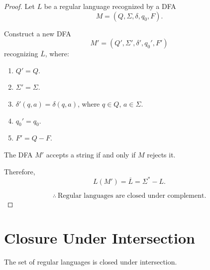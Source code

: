 \documentclass[11pt]{scrreprt}
\begin{document}
\begin{proof}
    Let $L$ be a regular language recognized by a DFA
    \[
        M = (Q, \Sigma, \delta, q_0, F).
    \]

    Construct a new DFA
    \[
        M' = (Q', \Sigma', \delta', q_0', F')
    \]
    recognizing $\overline{L}$, where:

    \begin{enumerate}
        \item $Q' = Q$.

        \item $\Sigma' = \Sigma$.

        \item $\delta'(q,a) = \delta(q,a)$,
        where $q \in Q$, $a \in \Sigma$.

        \item $q_0' = q_0$.

        \item $F' = Q - F$.
    \end{enumerate}

    The DFA $M'$ accepts a string if and only if
    $M$ rejects it.

    Therefore,
    \[
        L(M') = \overline{L} = \Sigma^* - L.
    \]

    \[
        \boxed{
            \therefore\ \text{Regular languages are closed under complement.}
        }
    \]
\end{proof}

\section{Closure Under Intersection}
\begin{theorem*}
    The set of regular languages is closed under intersection.
\end{theorem*}
\end{document}
